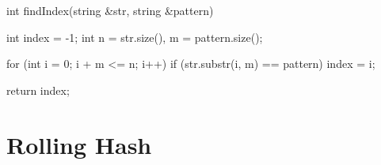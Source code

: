 \documentclass{report}
\begin{document}
\vspace{6ex}
\begin{code}
   int findIndex(string &str, string &pattern)
   {
      int index = -1;
      int n = str.size(), m = pattern.size();

      for (int i = 0; i + m <= n; i++)
         if (str.substr(i, m) == pattern)
            index = i;

      return index;
   }
\end{code}

\section{Rolling Hash}
\end{document}
